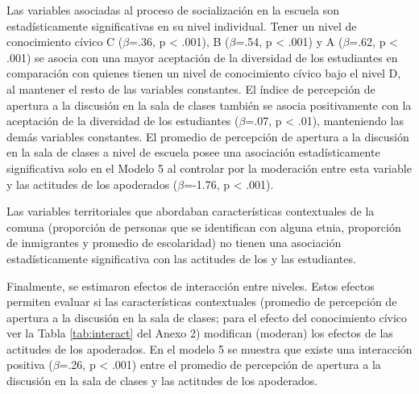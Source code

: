 \documentclass[12pt,twoside]{templates/facsothesis}
\begin{document}
Las variables asociadas al proceso de socialización en la escuela son estadísticamente significativas en su nivel individual. Tener un nivel de conocimiento cívico C (\(\beta\)=.36, p \textless{} .001), B (\(\beta\)=.54, p \textless{} .001) y A (\(\beta\)=.62, p \textless{} .001) se asocia con una mayor aceptación de la diversidad de los estudiantes en comparación con quienes tienen un nivel de conocimiento cívico bajo el nivel D, al mantener el resto de las variables constantes. El índice de percepción de apertura a la discusión en la sala de clases también se asocia positivamente con la aceptación de la diversidad de los estudiantes (\(\beta\)=.07, p \textless{} .01), manteniendo las demás variables constantes. El promedio de percepción de apertura a la discusión en la sala de clases a nivel de escuela posee una asociación estadísticamente significativa solo en el Modelo 5 al controlar por la moderación entre esta variable y las actitudes de los apoderados (\(\beta\)=-1.76, p \textless{} .001).

Las variables territoriales que abordaban características contextuales de la comuna (proporción de personas que se identifican con alguna etnia, proporción de inmigrantes y promedio de escolaridad) no tienen una asociación estadísticamente significativa con las actitudes de los y las estudiantes.

Finalmente, se estimaron efectos de interacción entre niveles. Estos efectos permiten evaluar si las características contextuales (promedio de percepción de apertura a la discusión en la sala de clases; para el efecto del conocimiento cívico ver la Tabla \ref{tab:interact} del Anexo 2) modifican (moderan) los efectos de las actitudes de los apoderados. En el modelo 5 se muestra que existe una interacción positiva (\(\beta\)=.26, p \textless{} .001) entre el promedio de percepción de apertura a la discusión en la sala de clases y las actitudes de los apoderados.
\end{document}
